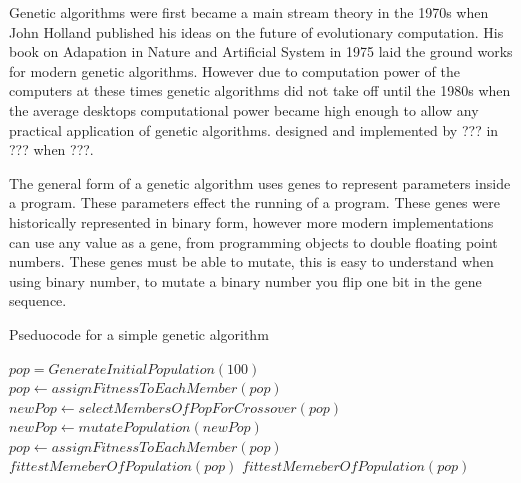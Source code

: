\documentclass[12pt]{article}
\begin{document}
Genetic algorithms were first became a main stream theory in the 1970s when John Holland published his ideas on the future of evolutionary 
computation. His book on Adapation in Nature and Artificial System in 1975 laid the ground works for modern genetic algorithms. However due to computation
power of the computers at these times genetic algorithms did not take off until the 1980s when the average desktops computational power became
high enough to allow any practical application of genetic algorithms. designed and implemented by ??? in ??? when ???.

The general form of a genetic algorithm uses genes to represent parameters inside a program.
These parameters effect the running of a program.
These genes were historically represented in binary form, however more modern implementations can use any value as a gene, from programming objects to double floating point numbers.
These genes must be able to mutate, this is easy to understand when using binary number, to mutate a binary number you flip one bit in the gene sequence. 

\begin{algorithm}
\caption{Pseduocode for a simple genetic algorithm}
\label{fig:garun}
\begin{algorithmic}

\State $pop = GenerateInitialPopulation(100)$
\State $pop \gets assignFitnessToEachMember(pop)$
	\State $newPop \gets selectMembersOfPopForCrossover(pop)$
	\State $newPop \gets mutatePopulation(newPop)$
	\State $pop \gets assignFitnessToEachMember(pop)$
		\State \Return $fittestMemeberOfPopulation(pop)$
	\EndIf
\EndWhile
\State \Return $fittestMemeberOfPopulation(pop)$


\end{algorithmic}
\end{algorithm}
\end{document}
